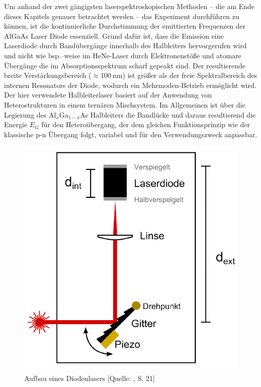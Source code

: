  \noindent Um anhand der zwei gängigsten laserspektroskopischen Methoden -- die am Ende dieses Kapitels genauer betrachtet werden -- das Experiment durchführen zu können, ist die kontinuierliche Durchstimmung der emittierten Frequenzen der AlGaAs Laser Diode essenziell. Grund dafür ist, dass die Emission eine Laserdiode durch Bandübergänge innerhalb des Halbleiters hervorgerufen wird und nicht wie bsp.--weise im HeNe-Laser durch Elektronenstöße und atomare Übergänge die im Absorptionsspektrum scharf gepeakt sind. Der resultierende breite Verstärkungsbereich ($\approx \SI{100}{\nano \meter}$) ist größer als der freie Spektralbereich des internen Resonators der Diode, wodurch ein Mehrmoden-Betrieb ermöglicht wird. Der hier verwendete Halbleiterlaser basiert auf der Anwendung von Heterostrukturen in einem ternären Mischsystem. Im Allgemeinen ist über die Legierung des Al$_{x}$Ga$_{1-x}$As Halbleiters die Bandlücke und daraus resultierend die Energie $E_{G}$ für den Heteroübergang, der dem gleichen Funktionsprinzip wie der klassische p-n Übergang folgt, variabel und für den Verwendungszweck anpassbar. \cite{Hunkl}\\

\begin{figure}[!h]
    \centering
    \includegraphics[scale = 0.4]{figures/images/diodenlaser.png}
    \caption{Aufbau eines Diodenlasers [Quelle: \cite{H2}, S. 21]}
    \label{fig:littrowgitter}
\end{figure}

